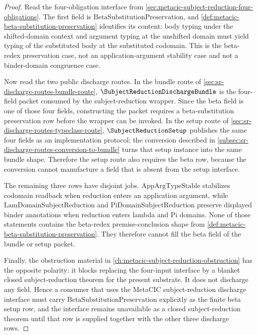 \begin{proof}
Read the four-obligation interface from \autoref{sec:metacic-subject-reduction-four-obligations}. The first field is $\mathrm{BetaSubstitutionPreservation}$, and \autoref{def:metacic-beta-substitution-preservation} identifies its content: body typing under the shifted-domain context and argument typing at the unshifted domain must yield typing of the substituted body at the substituted codomain. This is the beta-redex preservation case, not an application-argument stability case and not a binder-domain congruence case.

Now read the two public discharge routes. In the bundle route of \autoref{sec:sr-discharge-routes-bundle-route}, $\SubjectReductionDischargeBundle$ is the four-field packet consumed by the subject-reduction wrapper. Since the beta field is one of those four fields, constructing the packet requires a beta-substitution preservation row before the wrapper can be invoked. In the setup route of \autoref{sec:sr-discharge-routes-typeclass-route}, $\SubjectReductionSetup$ publishes the same four fields as an implementation protocol; the conversion described in \autoref{subsec:sr-discharge-routes-conversion-to-bundle} turns that setup instance into the same bundle shape. Therefore the setup route also requires the beta row, because the conversion cannot manufacture a field that is absent from the setup interface.

The remaining three rows have disjoint jobs. $\mathrm{AppArgTypeStable}$ stabilizes codomain readback when reduction enters an application argument, while $\mathrm{LamDomainSubjectReduction}$ and $\mathrm{PiDomainSubjectReduction}$ preserve displayed binder annotations when reduction enters lambda and Pi domains. None of those statements contains the beta-redex premise-conclusion shape from \autoref{def:metacic-beta-substitution-preservation}. They therefore cannot fill the beta field of the bundle or setup packet.

Finally, the obstruction material in \autoref{ch:metacic-subject-reduction-obstruction} has the opposite polarity: it blocks replacing the four-input interface by a blanket closed subject-reduction theorem for the present substrate. It does not discharge any field. Hence a consumer that uses the MetaCIC subject-reduction discharge interface must carry $\mathrm{BetaSubstitutionPreservation}$ explicitly as the finite beta setup row, and the interface remains unavailable as a closed subject-reduction theorem until that row is supplied together with the other three discharge rows.
\end{proof}

